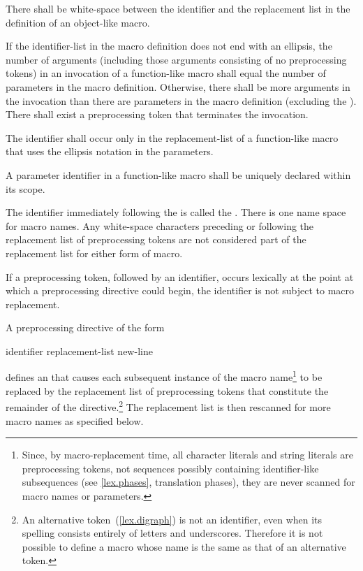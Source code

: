 \pnum
{}%
There shall be white-space between the identifier and the replacement list
in the definition of an object-like macro.

\pnum
If the identifier-list in the macro definition does not end with
an ellipsis, the number of arguments (including those arguments consisting
of no preprocessing tokens)
in an invocation of a function-like macro shall
equal the number of parameters in the macro definition. Otherwise, there shall be more arguments in the invocation than there are
parameters in the macro definition (excluding the ). There
shall exist a
\tcode{)}
preprocessing token that terminates the invocation.

\pnum
{}%
The identifier  shall occur only in the replacement-list
of a function-like macro that uses the ellipsis notation in the parameters.

\pnum
A parameter identifier in a function-like macro
shall be uniquely declared within its scope.

\pnum
The identifier immediately following the
is called the
%
%
.
There is one name space for macro names.
Any white-space characters preceding or following the
replacement list of preprocessing tokens are not considered
part of the replacement list for either form of macro.

\pnum
If a
\tcode{\#}
preprocessing token,
followed by an identifier,
occurs lexically
at the point at which a preprocessing directive could begin,
the identifier is not subject to macro replacement.

\pnum
A preprocessing directive of the form

\begin{ncsimplebnf}
 identifier replacement-list new-line
%
\end{ncsimplebnf}

defines an
%
 that
causes each subsequent instance of the macro name\footnote{Since, by macro-replacement time,
all character literals and string literals are preprocessing tokens,
not sequences possibly containing identifier-like subsequences
(see \ref{lex.phases}, translation phases),
they are never scanned for macro names or parameters.}
to be replaced by the replacement list of preprocessing tokens
that constitute the remainder of the directive.\footnote{An alternative token~(\ref{lex.digraph}) is not an identifier,
even when its spelling consists entirely of letters and underscores.
Therefore it is not possible to define a macro
whose name is the same as that of an alternative token.}
The replacement list is then rescanned for more macro names as
specified below.

